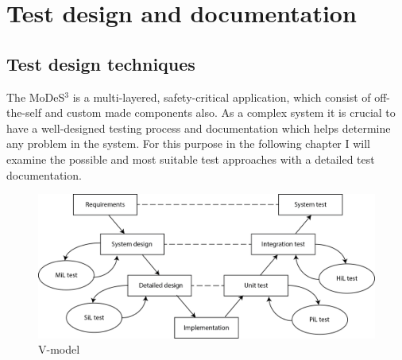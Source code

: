 \chapter{Test design and documentation}
\section{Test design techniques}

The MoDeS$^3$ is a multi-layered, safety-critical application, which consist of off-the-self and custom made components also. As a complex system it is crucial to have a well-designed testing process and documentation which helps determine any problem in the system. For this purpose in the following chapter I will examine the possible and most suitable test approaches with a detailed test documentation.

\begin{figure}[!h]
	\centering
	\includegraphics[width=150mm]{figures/testDesign/V_model.png}
	\caption{V-model}
	\label{fig:vModel}
\end{figure}

